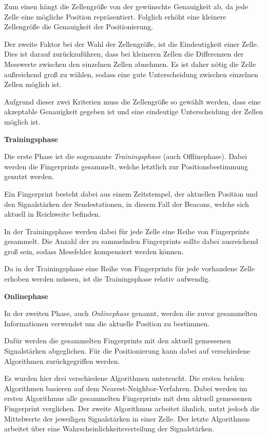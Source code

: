Zum einen hängt die Zellengröße von der gewünschte Genauigkeit ab, da jede Zelle eine mögliche Position repräsentiert. Folglich erhöht eine kleinere Zellengröße die Genauigkeit der Positionierung.

Der zweite Faktor bei der Wahl der Zellengröße, ist die Eindeutigkeit einer Zelle. Dies ist darauf zurückzuführen, dass bei kleineren Zellen die Differenzen der Messwerte zwischen den einzelnen Zellen abnehmen.
Es ist daher nötig die Zelle außreichend groß zu wählen, sodass eine gute Unterscheidung zwischen einzelnen Zellen möglich ist.

Aufgrund dieser zwei Kriterien muss die Zellengröße so gewählt werden, dass eine akzeptable Genauigkeit gegeben ist und eine eindeutige Unterscheidung der Zellen möglich ist.


\textbf{Trainingsphase}


Die erste Phase ist die sogenannte \emph{Trainingsphase} (auch Offlinephase). Dabei werden die Fingerprints gesammelt, welche letztlich zur Positionsbestimmung genutzt werden.

Ein Fingerprint besteht dabei aus einem Zeitstempel, der aktuellen Position und den Signalstärken der Sendestationen, in diesem Fall der Beacons, welche sich aktuell in Reichweite befinden.

In der Trainingsphase werden dabei für jede Zelle eine Reihe von Fingerprints gesammelt. Die Anzahl der zu sammelnden Fingerprints sollte dabei ausreichend groß sein, sodass Messfehler kompensiert werden können.

Da in der Trainingsphase eine Reihe von Fingerprints für jede vorhandene Zelle erhoben werden müssen, ist die Trainingsphase relativ aufwendig.


\textbf{Onlinephase}


In der zweiten Phase, auch \emph{Onlinephase} genannt, werden die zuvor gesammelten Informationen verwendet um die aktuelle Position zu bestimmen. 

Dafür werden die gesammelten Fingerprints mit den aktuell gemessenen Signalstärken abgeglichen. Für die Positionierung kann dabei auf verschiedene Algorithmen zurückgegriffen werden.

Es wurden hier drei verschiedene Algorithmen untersucht. Die ersten beiden Algorithmen basieren auf dem Nearest-Neighbor-Verfahren. Dabei werden im ersten Algorithmus alle gesammelten Fingerprints mit dem aktuell gemessenen Fingerprint verglichen. Der zweite Algorithmus arbeitet ähnlich, nutzt jedoch die Mittelwerte der jeweiligen Signalstärken in einer Zelle. 
Der letzte Algorithmus arbeitet über eine Wahrscheinlichkeitsverteilung der Signalstärken.


